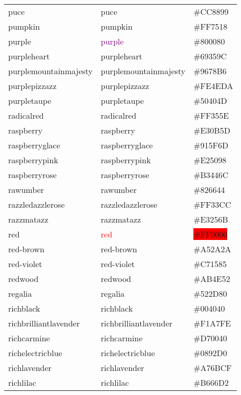 \documentclass[
]{article}
\begin{document}
\begin{longtable}[]{@{}lll@{}}
puce & \textcolor{puce}{puce} & \colorbox{puce}{\#CC8899}\tabularnewline
pumpkin & \textcolor{pumpkin}{pumpkin} &
\colorbox{pumpkin}{\#FF7518}\tabularnewline
purple & \textcolor{purple}{purple} &
\colorbox{patriarch}{\#800080}\tabularnewline
purpleheart & \textcolor{purpleheart}{purpleheart} &
\colorbox{purpleheart}{\#69359C}\tabularnewline
purplemountainmajesty &
\textcolor{purplemountainmajesty}{purplemountainmajesty} &
\colorbox{purplemountainmajesty}{\#9678B6}\tabularnewline
purplepizzazz & \textcolor{purplepizzazz}{purplepizzazz} &
\colorbox{purplepizzazz}{\#FE4EDA}\tabularnewline
purpletaupe & \textcolor{purpletaupe}{purpletaupe} &
\colorbox{purpletaupe}{\#50404D}\tabularnewline
radicalred & \textcolor{radicalred}{radicalred} &
\colorbox{radicalred}{\#FF355E}\tabularnewline
raspberry & \textcolor{raspberry}{raspberry} &
\colorbox{raspberry}{\#E30B5D}\tabularnewline
raspberryglace & \textcolor{raspberryglace}{raspberryglace} &
\colorbox{mauvetaupe}{\#915F6D}\tabularnewline
raspberrypink & \textcolor{raspberrypink}{raspberrypink} &
\colorbox{raspberrypink}{\#E25098}\tabularnewline
raspberryrose & \textcolor{raspberryrose}{raspberryrose} &
\colorbox{raspberryrose}{\#B3446C}\tabularnewline
rawumber & \textcolor{rawumber}{rawumber} &
\colorbox{rawumber}{\#826644}\tabularnewline
razzledazzlerose & \textcolor{razzledazzlerose}{razzledazzlerose} &
\colorbox{razzledazzlerose}{\#FF33CC}\tabularnewline
razzmatazz & \textcolor{razzmatazz}{razzmatazz} &
\colorbox{razzmatazz}{\#E3256B}\tabularnewline
red & \textcolor{red}{red} & \colorbox{red}{\#FF0000}\tabularnewline
red-brown & \textcolor{red-brown}{red-brown} &
\colorbox{red-brown}{\#A52A2A}\tabularnewline
red-violet & \textcolor{red-violet}{red-violet} &
\colorbox{mediumviolet-red}{\#C71585}\tabularnewline
redwood & \textcolor{redwood}{redwood} &
\colorbox{redwood}{\#AB4E52}\tabularnewline
regalia & \textcolor{regalia}{regalia} &
\colorbox{regalia}{\#522D80}\tabularnewline
richblack & \textcolor{richblack}{richblack} &
\colorbox{richblack}{\#004040}\tabularnewline
richbrilliantlavender &
\textcolor{richbrilliantlavender}{richbrilliantlavender} &
\colorbox{richbrilliantlavender}{\#F1A7FE}\tabularnewline
richcarmine & \textcolor{richcarmine}{richcarmine} &
\colorbox{richcarmine}{\#D70040}\tabularnewline
richelectricblue & \textcolor{richelectricblue}{richelectricblue} &
\colorbox{richelectricblue}{\#0892D0}\tabularnewline
richlavender & \textcolor{richlavender}{richlavender} &
\colorbox{richlavender}{\#A76BCF}\tabularnewline
richlilac & \textcolor{richlilac}{richlilac} &
\colorbox{richlilac}{\#B666D2}\tabularnewline

\end{longtable}
\end{document}

